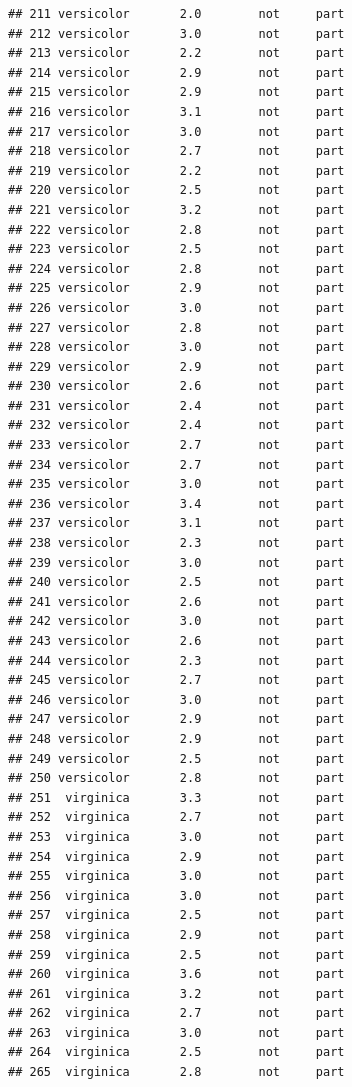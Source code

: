 \documentclass[krantz2]{krantz}\usepackage{knitr}%
\begin{document}
\begin{knitrout}
\begin{kframe}
\begin{verbatim}
## 211 versicolor       2.0        not     part
## 212 versicolor       3.0        not     part
## 213 versicolor       2.2        not     part
## 214 versicolor       2.9        not     part
## 215 versicolor       2.9        not     part
## 216 versicolor       3.1        not     part
## 217 versicolor       3.0        not     part
## 218 versicolor       2.7        not     part
## 219 versicolor       2.2        not     part
## 220 versicolor       2.5        not     part
## 221 versicolor       3.2        not     part
## 222 versicolor       2.8        not     part
## 223 versicolor       2.5        not     part
## 224 versicolor       2.8        not     part
## 225 versicolor       2.9        not     part
## 226 versicolor       3.0        not     part
## 227 versicolor       2.8        not     part
## 228 versicolor       3.0        not     part
## 229 versicolor       2.9        not     part
## 230 versicolor       2.6        not     part
## 231 versicolor       2.4        not     part
## 232 versicolor       2.4        not     part
## 233 versicolor       2.7        not     part
## 234 versicolor       2.7        not     part
## 235 versicolor       3.0        not     part
## 236 versicolor       3.4        not     part
## 237 versicolor       3.1        not     part
## 238 versicolor       2.3        not     part
## 239 versicolor       3.0        not     part
## 240 versicolor       2.5        not     part
## 241 versicolor       2.6        not     part
## 242 versicolor       3.0        not     part
## 243 versicolor       2.6        not     part
## 244 versicolor       2.3        not     part
## 245 versicolor       2.7        not     part
## 246 versicolor       3.0        not     part
## 247 versicolor       2.9        not     part
## 248 versicolor       2.9        not     part
## 249 versicolor       2.5        not     part
## 250 versicolor       2.8        not     part
## 251  virginica       3.3        not     part
## 252  virginica       2.7        not     part
## 253  virginica       3.0        not     part
## 254  virginica       2.9        not     part
## 255  virginica       3.0        not     part
## 256  virginica       3.0        not     part
## 257  virginica       2.5        not     part
## 258  virginica       2.9        not     part
## 259  virginica       2.5        not     part
## 260  virginica       3.6        not     part
## 261  virginica       3.2        not     part
## 262  virginica       2.7        not     part
## 263  virginica       3.0        not     part
## 264  virginica       2.5        not     part
## 265  virginica       2.8        not     part

\end{verbatim}
\end{kframe}
\end{knitrout}
\end{document}
